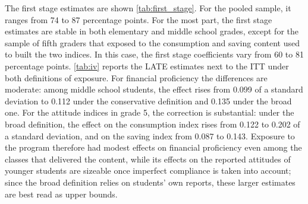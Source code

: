 The first stage estimates are shown \autoref{tab:first_stage}. For the pooled sample, it ranges from 74 to 87 percentage points. For the most part, the first stage estimates are stable in both elementary and middle school grades, except for the sample of fifth graders that exposed to the consumption and saving content used to built the two indices. In this case, the first stage coefficients vary from 60 to 81 percentage points. \autoref{tab:iv} reports the LATE estimates next to the ITT under both definitions of exposure. For financial proficiency the differences are moderate: among middle school students, the effect rises from 0.099 of a standard deviation to 0.112 under the conservative definition and 0.135 under the broad one. For the attitude indices in grade 5, the correction is substantial: under the broad definition, the effect on the consumption index rises from 0.122 to 0.202 of a standard deviation, and on the saving index from 0.087 to 0.143. Exposure to the program therefore had modest effects on financial proficiency even among the classes that delivered the content, while its effects on the reported attitudes of younger students are sizeable once imperfect compliance is taken into account; since the broad definition relies on students' own reports, these larger estimates are best read as upper bounds. 

\vspace{10 pt}

